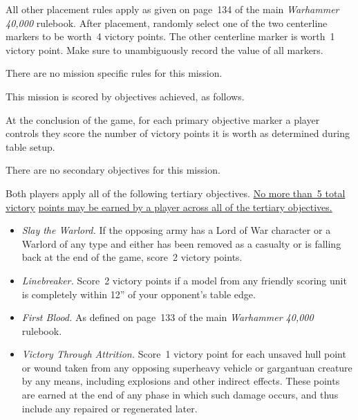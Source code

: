 All other placement rules apply as given on page~134 of the main
\emph{Warhammer 40,000} rulebook.  After placement, randomly select
one of the two centerline markers to be worth~4 victory points.  The
other centerline marker is worth~1 victory point.  Make sure to
unambiguously record the value of all markers.



There are no mission specific rules for this mission.



This mission is scored by objectives achieved, as follows.

 At the conclusion of the game,
for each primary objective marker a player controls they score the
number of victory points it is worth as determined during table setup.


There are no secondary objectives for this mission.

  Both players apply all of
the following tertiary objectives.  \underline{No more than~5 total
  victory} \underline{points may be earned by a player across all of
  the tertiary objectives.}

\begin{itemize}
\item \textit{Slay the Warlord.}  If the opposing army has a Lord of
  War character or a Warlord of any type and either has been removed
  as a casualty or is falling back at the end of the game, score~2
  victory points.

\item \textit{Linebreaker.}  Score~2 victory points if a model from
  any friendly scoring unit is completely within 12'' of your
  opponent's table edge.

\item \textit{First Blood.}  As defined on page~133 of the main
  \emph{Warhammer 40,000} rulebook.

\item \textit{Victory Through Attrition.}  Score~1 victory point for
  each unsaved hull point or wound taken from any opposing superheavy
  vehicle or gargantuan creature by any means, including explosions
  and other indirect effects.  These points are earned at the end of
  any phase in which such damage occurs, and thus include any repaired
  or regenerated later.
\end{itemize}


